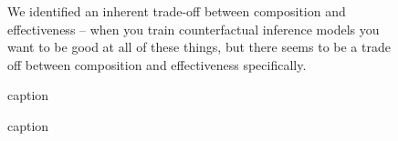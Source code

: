\documentclass[11pt]{article}
\begin{document}
\begin{figure}[H]
    \centering
    \caption{We identified an inherent trade-off between composition and effectiveness -- when you train counterfactual inference models you want to be good at all of these things, but there seems to be a trade off between composition and effectiveness specifically.}
\end{figure}

\begin{figure}[H]
    \centering
    \caption{caption}
\end{figure}

\begin{figure}[H]
    \centering
    \caption{caption}
\end{figure}

\printbibliography
{}
\end{document}
